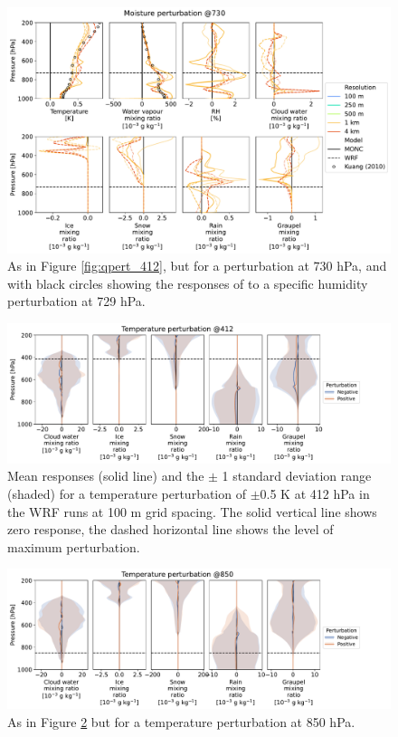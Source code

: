 \documentclass[draft]{agujournal2019}
\begin{document}
\begin{figure}[pth]
    \noindent\includegraphics[width=\textwidth]{figures/pert_diffs_q_0.0002_@730}
    \caption{As in Figure \ref{fig:qpert_412}, but for a perturbation at 730
    hPa, and with black circles showing the responses of 
    to a specific humidity perturbation at 729 hPa.}
    \label{fig:qpert_730}
\end{figure}

\begin{figure}[pth]
    \noindent\includegraphics[width=\textwidth]{figures/pert_var_T_0.5_@412}
    \caption{Mean responses (solid line) and the $\pm$ 1 standard deviation
    range (shaded) for a temperature perturbation of $\pm$0.5 K at 412 hPa in
    the WRF runs at 100 m grid spacing. The solid vertical line shows zero
    response, the dashed horizontal line shows the level of maximum
    perturbation.}
    \label{fig:var_T_412}
\end{figure}

\begin{figure}[pth]
    \noindent\includegraphics[width=\textwidth]{figures/pert_var_T_0.5_@850}
    \caption{As in Figure \ref{fig:var_T_412} but for a temperature perturbation
    at 850 hPa.}
    \label{fig:var_T_850}
\end{figure}
\end{document}
